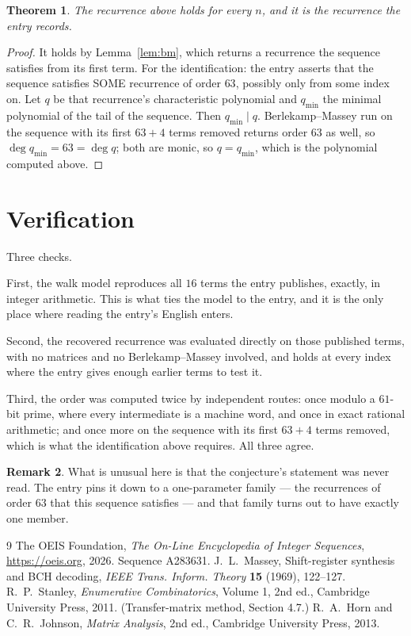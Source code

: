 \documentclass[11pt,a4paper]{article}
\theoremstyle{plain}
\newtheorem{theorem}{Theorem}
\theoremstyle{definition}
\newtheorem{remark}[theorem]{Remark}
\begin{document}
\begin{theorem}
The recurrence above holds for every $n$, and it is the recurrence the entry records.
\end{theorem}

\begin{proof}
It holds by Lemma~\ref{lem:bm}, which returns a recurrence the sequence satisfies from its
first term. For the identification: the entry asserts that the sequence satisfies SOME
recurrence of order $63$, possibly only from some index on. Let $q$ be that recurrence's
characteristic polynomial and $q_{\min}$ the minimal polynomial of the tail of the sequence.
Then $q_{\min}\mid q$. Berlekamp--Massey run on the sequence with its first $63+4$ terms
removed returns order $63$ as well, so $\deg q_{\min}=63=\deg q$; both are monic, so
$q=q_{\min}$, which is the polynomial computed above.
\end{proof}

\section{Verification}

Three checks.

First, the walk model reproduces all $16$ terms the entry publishes, exactly, in integer
arithmetic. This is what ties the model to the entry, and it is the only place where reading
the entry's English enters.

Second, the recovered recurrence was evaluated directly on those published terms, with no
matrices and no Berlekamp--Massey involved, and holds at every index where the entry gives
enough earlier terms to test it.

Third, the order was computed twice by independent routes: once modulo a $61$-bit prime, where
every intermediate is a machine word, and once in exact rational arithmetic; and once more on
the sequence with its first $63+4$ terms removed, which is what the identification above
requires. All three agree.

\begin{remark}
What is unusual here is that the conjecture's statement was never read. The entry pins it down
to a one-parameter family --- the recurrences of order $63$ that this sequence satisfies
--- and that family turns out to have exactly one member.
\end{remark}

\begin{thebibliography}{9}
 The OEIS Foundation, \emph{The On-Line Encyclopedia of Integer
Sequences}, \url{https://oeis.org}, 2026. Sequence A283631.
 J.~L.~Massey, Shift-register synthesis and BCH decoding, \emph{IEEE
Trans. Inform. Theory} \textbf{15} (1969), 122--127.
 R.~P.~Stanley, \emph{Enumerative Combinatorics}, Volume 1, 2nd ed.,
Cambridge University Press, 2011. (Transfer-matrix method, Section 4.7.)
 R.~A.~Horn and C.~R.~Johnson, \emph{Matrix Analysis}, 2nd ed., Cambridge
University Press, 2013.
\end{thebibliography}
\end{document}
